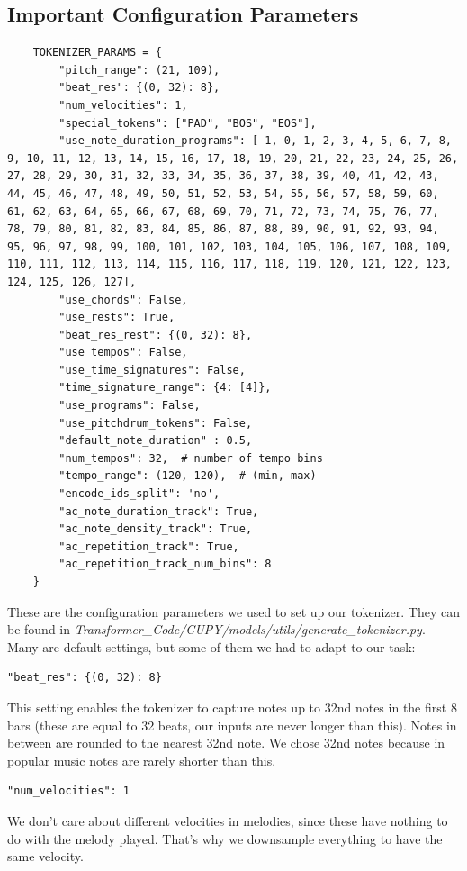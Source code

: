 \documentclass[a4paper,12pt]{extarticle}
\begin{document}
\subsection{Important Configuration Parameters}
\begin{lstlisting}
    TOKENIZER_PARAMS = {
        "pitch_range": (21, 109),
        "beat_res": {(0, 32): 8},
        "num_velocities": 1,
        "special_tokens": ["PAD", "BOS", "EOS"],
        "use_note_duration_programs": [-1, 0, 1, 2, 3, 4, 5, 6, 7, 8, 9, 10, 11, 12, 13, 14, 15, 16, 17, 18, 19, 20, 21, 22, 23, 24, 25, 26, 27, 28, 29, 30, 31, 32, 33, 34, 35, 36, 37, 38, 39, 40, 41, 42, 43, 44, 45, 46, 47, 48, 49, 50, 51, 52, 53, 54, 55, 56, 57, 58, 59, 60, 61, 62, 63, 64, 65, 66, 67, 68, 69, 70, 71, 72, 73, 74, 75, 76, 77, 78, 79, 80, 81, 82, 83, 84, 85, 86, 87, 88, 89, 90, 91, 92, 93, 94, 95, 96, 97, 98, 99, 100, 101, 102, 103, 104, 105, 106, 107, 108, 109, 110, 111, 112, 113, 114, 115, 116, 117, 118, 119, 120, 121, 122, 123, 124, 125, 126, 127],
        "use_chords": False,
        "use_rests": True,
        "beat_res_rest": {(0, 32): 8},
        "use_tempos": False,
        "use_time_signatures": False,
        "time_signature_range": {4: [4]},
        "use_programs": False,
        "use_pitchdrum_tokens": False,
        "default_note_duration" : 0.5, 
        "num_tempos": 32,  # number of tempo bins
        "tempo_range": (120, 120),  # (min, max)
        "encode_ids_split": 'no',
        "ac_note_duration_track": True,
        "ac_note_density_track": True,
        "ac_repetition_track": True,
        "ac_repetition_track_num_bins": 8
    }
\end{lstlisting}
These are the configuration parameters we used to set up our tokenizer. They can be found in \textit{Transformer\_Code/CUPY/models/utils/generate\_tokenizer.py}. Many are default settings, but some of them we had to adapt to our task:\newline
\begin{lstlisting}
"beat_res": {(0, 32): 8}   
\end{lstlisting}
This setting enables the tokenizer to capture notes up to 32nd notes in the first 8 bars (these are equal to 32 beats, our inputs are never longer than this). Notes in between are rounded to the nearest 32nd note. We chose 32nd notes because in popular music notes are rarely shorter than this. \newline
\begin{lstlisting}
"num_velocities": 1
\end{lstlisting}
We don't care about different velocities in melodies, since these have nothing to do with the melody played. That's why we downsample everything to have the same velocity. \newline
\end{document}
